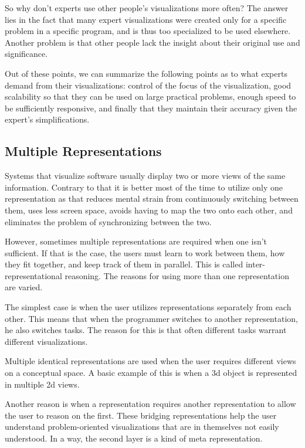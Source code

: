 \documentclass[11pt, a4paper, ngerman, twoside]{article}
\theoremstyle{plain}\newtheorem{Lemma}{Lemma}
\theoremstyle{plain}\newtheorem{Satz}[Lemma]{Satz}
\theoremstyle{definition}\newtheorem{Definition}[Lemma]{Definition}
\theoremstyle{definition}\newtheorem*{Beispiel}{Beispiel}
\theoremstyle{remark}\newtheorem*{Bemerkung}{Bemerkung}
\begin{document}
So why don't experts use other people's visualizations more often? The answer lies in the fact that many expert visualizations were created only for a specific problem in a specific program, and is thus too specialized to be used elsewhere. Another problem is that other people lack the insight about their original use and significance.

Out of these points, we can summarize the following points as to what experts demand from their visualizations: control of the focus of the visualization, good scalability so that they can be used on large practical problems, enough speed to be sufficiently responsive, and finally that they maintain their accuracy given the expert's simplifications.

\subsection{Multiple Representations}

Systems that visualize software usually display two or more views of the same information. Contrary to that it is better most of the time to utilize only one representation as that reduces mental strain from continuously switching between them, uses less screen space, avoids having to map the two onto each other, and eliminates the problem of synchronizing between the two.

However, sometimes multiple representations are required when one isn't sufficient. If that is the case, the users must learn to work between them, how they fit together, and keep track of them in parallel. This is called inter-representational reasoning. The reasons for using more than one representation are varied.

The simplest case is when the user utilizes representations separately from each other. This means that when the programmer switches to another representation, he also switches tasks. The reason for this is that often different tasks warrant different visualizations.

Multiple identical representations are used when the user requires different views on a conceptual space. A basic example of this is when a 3d object is represented in multiple 2d views.

Another reason is when a representation requires another representation to allow the user to reason on the first. These bridging representations help the user understand problem-oriented visualizations that are in themselves not easily understood. In a way, the second layer is a kind of meta representation.
\end{document}
